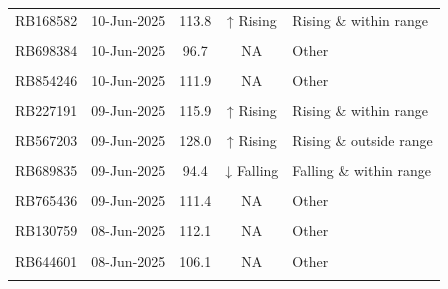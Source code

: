 \documentclass[
]{article}
\begin{document}
\begin{table}[!h]
\begin{tabular}[t]{lcccl}
\addlinespace
RB168582 & 10-Jun-2025 & 113.8 & ↑ Rising & Rising \& within range\\
\cellcolor{gray!10}{RB327568} & \cellcolor{gray!10}{10-Jun-2025} & \cellcolor{gray!10}{96.5} & \cellcolor{gray!10}{↓ Falling} & \cellcolor{gray!10}{Falling \& within range}\\
RB698384 & 10-Jun-2025 & 96.7 & NA & Other\\
\cellcolor{gray!10}{RB791855} & \cellcolor{gray!10}{10-Jun-2025} & \cellcolor{gray!10}{117.2} & \cellcolor{gray!10}{NA} & \cellcolor{gray!10}{Other}\\
RB854246 & 10-Jun-2025 & 111.9 & NA & Other\\
\addlinespace
\cellcolor{gray!10}{RB957782} & \cellcolor{gray!10}{10-Jun-2025} & \cellcolor{gray!10}{101.2} & \cellcolor{gray!10}{↓ Falling} & \cellcolor{gray!10}{Falling \& within range}\\
RB227191 & 09-Jun-2025 & 115.9 & ↑ Rising & Rising \& within range\\
\cellcolor{gray!10}{RB363765} & \cellcolor{gray!10}{09-Jun-2025} & \cellcolor{gray!10}{108.4} & \cellcolor{gray!10}{NA} & \cellcolor{gray!10}{Other}\\
RB567203 & 09-Jun-2025 & 128.0 & ↑ Rising & Rising \& outside range\\
\cellcolor{gray!10}{RB631378} & \cellcolor{gray!10}{09-Jun-2025} & \cellcolor{gray!10}{104.1} & \cellcolor{gray!10}{NA} & \cellcolor{gray!10}{Other}\\
\addlinespace
RB689835 & 09-Jun-2025 & 94.4 & ↓ Falling & Falling \& within range\\
\cellcolor{gray!10}{RB693898} & \cellcolor{gray!10}{09-Jun-2025} & \cellcolor{gray!10}{111.7} & \cellcolor{gray!10}{NA} & \cellcolor{gray!10}{Other}\\
RB765436 & 09-Jun-2025 & 111.4 & NA & Other\\
\cellcolor{gray!10}{RB930049} & \cellcolor{gray!10}{09-Jun-2025} & \cellcolor{gray!10}{109.0} & \cellcolor{gray!10}{NA} & \cellcolor{gray!10}{Other}\\
RB130759 & 08-Jun-2025 & 112.1 & NA & Other\\
\addlinespace
\cellcolor{gray!10}{RB380638} & \cellcolor{gray!10}{08-Jun-2025} & \cellcolor{gray!10}{118.4} & \cellcolor{gray!10}{↑ Rising} & \cellcolor{gray!10}{Rising \& within range}\\
RB644601 & 08-Jun-2025 & 106.1 & NA & Other\\
\cellcolor{gray!10}{RB645747} & \cellcolor{gray!10}{08-Jun-2025} & \cellcolor{gray!10}{93.2} & \cellcolor{gray!10}{NA} & \cellcolor{gray!10}{Other}\\

\end{tabular}
\end{table}
\end{document}
